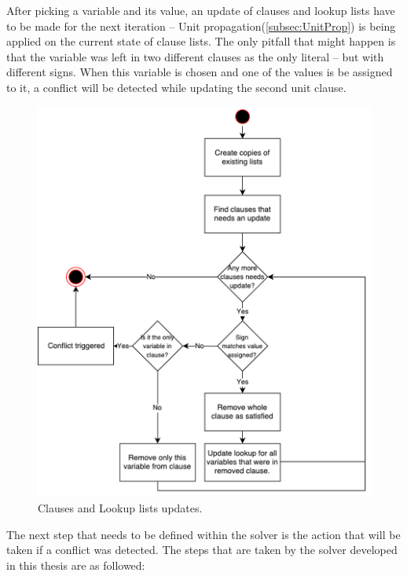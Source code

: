 \documentclass[12pt,english,pdflatex]{aghdpl}
\begin{document}
After picking a variable and its value, an update of clauses and lookup
lists have to be made for the next iteration -- Unit propagation(\ref{subsec:UnitProp}) is being applied on the current state of clause lists. The
only pitfall that might happen is that the variable was left in two different
clauses as the only literal -- but with different signs. When this
variable is  chosen and one of the values is be assigned to it,
a conflict will be detected while updating the second unit clause.

\begin{figure}[H]
\begin{centering}
\includegraphics[scale=0.7]{img/update_variable}
\par\end{centering}
\caption{Clauses and Lookup lists updates.}
\end{figure}

The next step that needs to be defined within the solver is the action that will
be taken if a conflict was detected. The steps that are taken by the solver
developed in this thesis are as followed:
\end{document}
